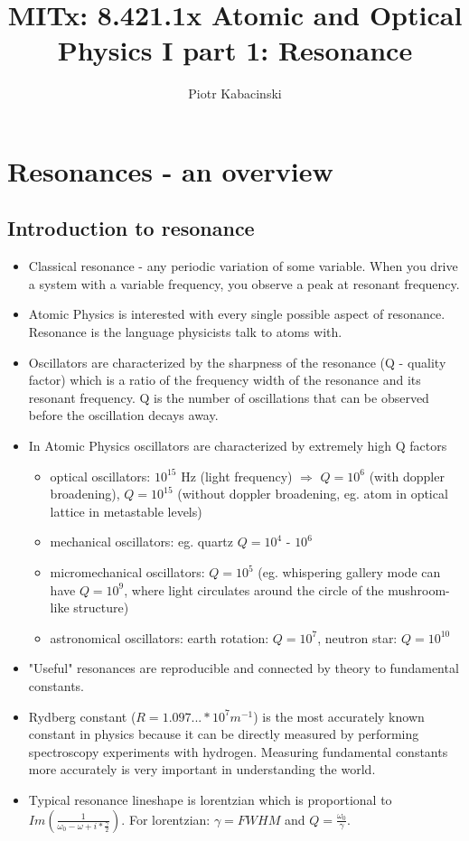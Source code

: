 
\title{MITx: 8.421.1x Atomic and Optical Physics I part 1: Resonance}
\author{Piotr Kabacinski}

\maketitle

\section{Resonances - an overview}
	\subsection{Introduction to resonance}
				\begin{itemize}
					\item Classical resonance - any periodic variation of some variable. When you drive a system with a variable frequency, you observe a peak at resonant frequency.
					\item Atomic Physics is interested with every single possible aspect of resonance. Resonance is the language physicists talk to atoms with.
					\item Oscillators are characterized by the sharpness of the resonance (Q - quality factor) which is a ratio of the frequency width of the resonance and its resonant frequency. Q is the number of oscillations that can be observed before the oscillation decays away.
					\item In Atomic Physics oscillators are characterized by extremely high Q factors
						\begin{itemize}
							\item optical oscillators: $10^{15}$ Hz (light frequency) $\Rightarrow$ $Q = 10^6$	(with doppler broadening), $Q = 10^{15}$ (without doppler broadening, eg. atom in optical lattice in metastable levels)
							\item mechanical oscillators: eg. quartz $Q = 10^4$ - $10^6$
							\item micromechanical oscillators: $Q = 10^5$ (eg. whispering gallery mode can have $Q = 10^9$, where light circulates around the circle of the mushroom-like structure)
							\item astronomical oscillators: earth rotation: $Q = 10^7$, neutron star: $Q = 10^{10}$
						\end{itemize}
					\item "Useful" resonances are reproducible and connected by theory to fundamental constants.
					\item Rydberg constant ($R = 1.097... * 10^7 m^{-1}$) is the most accurately known constant in physics because it can be directly measured by performing spectroscopy experiments with hydrogen. Measuring fundamental constants more accurately is very important in understanding the world.
					\item Typical resonance lineshape is lorentzian which is proportional to $Im\left(\frac{1}{\omega_0-\omega+i*\frac{\gamma}{2}}\right)$. For lorentzian: $\gamma = FWHM$ and $Q = \frac{\omega_0}{\gamma}$.
				\end{itemize}
